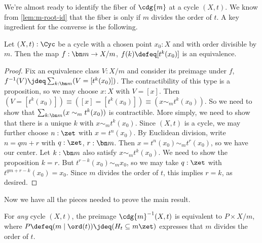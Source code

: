 We're almost ready to identify the fiber of $\cdg{m}$ at a cycle $(X,t)$.
We know from \cref{lem:m-root-id} that the fiber 
is \nonempty only if $m$ divides the order of $t$.
A key ingredient for the converse is the following.
\begin{lemma}\label{lem:X-mod-m-chosen}
  Let $(X,t):\Cyc$ be a cycle with a chosen point $x_0:X$
  and with order divisible by $m$.
  Then the map $f : \bn m \to X/m$, $f(k) \defeq [t^k(x_0)]$
  is an equivalence.
\end{lemma}
\begin{proof}
  Fix an equivalence class $V:X/m$ and consider its preimage under $f$,
  $f^{-1}(V) \jdeq \sum_{k:\bn m}(V=[t^k(x_0)])$.
  The contractibility of this type is a proposition, so we may choose
  $x:X$ with $V=[x]$.
  Then $(V=[t^k(x_0)])\equiv([x]=[t^k(x_0)])\equiv(x\sim_m t^k(x_0))$.
  So we need to show that $\sum_{k:\bn m}(x\sim_m t^k(x_0))$ is contractible.
  More simply, we need to show that there is a unique $k$ with $x\sim_m t^k(x_0)$.
  Since $(X,t)$ is a cycle, we may further choose $n:\zet$ with $x=t^n(x_0)$.
  By Euclidean division, write $n=qm+r$ with $q:\zet$, $r:\bn m$.
  Then $x = t^n(x_0) \sim_m t^r(x_0)$, so we have our center.
  Let $k:\bn m$ also satisfy $x\sim_m t^k(x_0)$.
  We need to show the proposition $k=r$.
  But $t^{r-k}(x_0) \sim_m x_0$, so we may take $q:\zet$ with $t^{qm+r-k}(x_0)=x_0$.
  Since $m$ divides the order of $t$, this implies $r=k$, as desired.
\end{proof}
Now we have all the pieces needed to prove the main result.
\begin{theorem}\label{thm:fiber-cdg}
  For \emph{any} cycle $(X,t)$, the preimage $\cdg{m}^{-1}(X,t)$
  is equivalent to $P\times X/m$,
  where $P\defeq (m \mid \ord(t)) \jdeq (H_t \subseteq m\zet)$
  expresses that $m$ divides the order of $t$.
\end{theorem}
